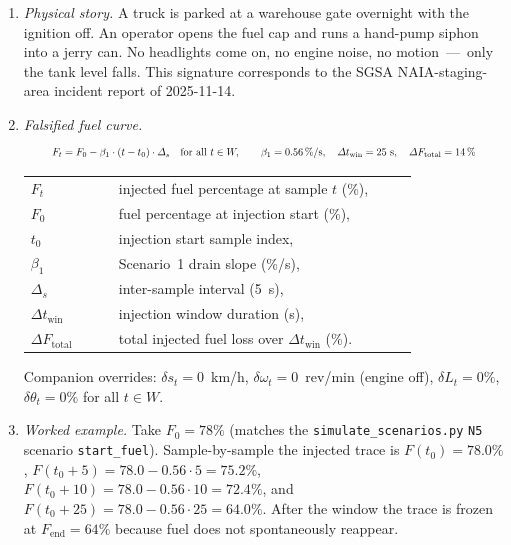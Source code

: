 \begin{enumerate}[label=\textbf{(\alph*)}, leftmargin=*]
    \item \textit{Physical story.} A truck is parked at a warehouse gate overnight with the ignition off. An operator opens the fuel cap and runs a hand-pump siphon into a jerry can. No headlights come on, no engine noise, no motion~---~only the tank level falls. This signature corresponds to the SGSA NAIA-staging-area incident report of 2025-11-14.

    \item \textit{Falsified fuel curve.}
    \begin{equation}
    \resizebox{0.88\linewidth}{!}{$\displaystyle
    F_t = F_0 - \beta_1 \cdot (t - t_0) \cdot \Delta_s \quad \text{for all } t \in W, \qquad \beta_1 = 0.56\,\%/\text{s}, \quad \Delta t_{\mathrm{win}} = 25\text{ s}, \quad \Delta F_{\mathrm{total}} = 14\,\%
    $}
    \label{eq:injection_s1}
    \end{equation}
    \noindent\begin{tabular}{@{}p{0.20\linewidth}@{\quad}p{0.68\linewidth}@{}}
    $F_t$ & injected fuel percentage at sample $t$ (\%), \\
    $F_0$ & fuel percentage at injection start (\%), \\
    $t_0$ & injection start sample index, \\
    $\beta_1$ & Scenario~1 drain slope (\%/s), \\
    $\Delta_s$ & inter-sample interval (5~s), \\
    $\Delta t_{\mathrm{win}}$ & injection window duration (s), \\
    $\Delta F_{\mathrm{total}}$ & total injected fuel loss over $\Delta t_{\mathrm{win}}$ (\%).
    \end{tabular}

    \vspace{0.5em}
    Companion overrides: $\delta s_t = 0$~km/h, $\delta \omega_t = 0$~rev/min (engine off), $\delta L_t = 0\%$, $\delta \theta_t = 0\%$ for all $t \in W$.

    \item \textit{Worked example.} Take $F_0 = 78\%$ (matches the \texttt{simulate\_scenarios.py} \texttt{N5} scenario \texttt{start\_fuel}). Sample-by-sample the injected trace is $F(t_0) = 78.0\%$, $F(t_0 + 5) = 78.0 - 0.56 \cdot 5 = 75.2\%$, $F(t_0 + 10) = 78.0 - 0.56 \cdot 10 = 72.4\%$, and $F(t_0 + 25) = 78.0 - 0.56 \cdot 25 = 64.0\%$. After the window the trace is frozen at $F_{\mathrm{end}} = 64\%$ because fuel does not spontaneously reappear.


\end{enumerate}

